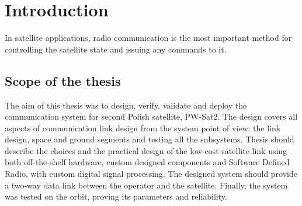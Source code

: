 \chapter{Introduction}
In satellite applications, radio communication is the most important method for controlling the satellite state and issuing any commands to it.


\section{Scope of the thesis}
The aim of this thesis was to design, verify, validate and deploy the communication system for second Polish satellite, PW-Sat2. The design covers all aspects of communication link design from the system point of view: the link design, space and ground segments and testing all the subsystems. Thesis should describe the choices and the practical design of the low-cost satellite link using both off-the-shelf hardware, custom designed components and Software Defined Radio, with custom digital signal processing. The designed system should provide a two-way data link between the operator and the satellite. Finally, the system was tested on the orbit, proving its parameters and reliability.

